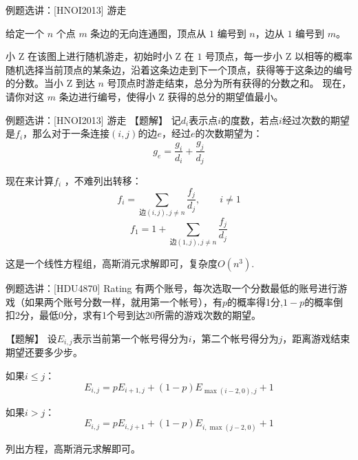 \documentclass{beamer}
\begin{document}
\begin{frame}{例题选讲：[HNOI2013] 游走}

给定一个 $n$ 个点 $m$ 条边的无向连通图，顶点从 $1$ 编号到 $n$，边从 $1$ 编号到 $m$。 

小 Z 在该图上进行随机游走，初始时小 Z 在 $1$ 号顶点，每一步小 Z 以相等的概率随机选择当前顶点的某条边，沿着这条边走到下一个顶点，获得等于这条边的编号的分数。当小 Z 到达 $n$ 号顶点时游走结束，总分为所有获得的分数之和。 现在，请你对这 $m$ 条边进行编号，使得小 Z 获得的总分的期望值最小。

\end{frame}

\begin{frame}{例题选讲：[HNOI2013] 游走}
    【题解】 记$d_i$表示点$i$的度数，若点$i$经过次数的期望是$f_i$，那么对于一条连接$(i,j)$的边$e$，经过$e$的次数期望为：
    \begin{equation*}
        g_e=\frac{g_i}{d_i}+\frac{g_j}{d_j}
    \end{equation*}

    现在来计算$f_i$
    \pause
    ，不难列出转移：
    \begin{equation*}
        f_i=\sum_{\text{边}(i,j),j\neq n} \frac{f_j}{d_j},\qquad i\neq 1
    \end{equation*}
    \begin{equation*}
        f_1=1+\sum_{\text{边}(1,j),j\neq n} \frac{f_j}{d_j}
    \end{equation*}

    这是一个线性方程组，高斯消元求解即可，复杂度$O(n^3)$.
\end{frame}

\begin{frame}{例题选讲：[HDU4870] Rating}
    \small 
    有两个账号，每次选取一个分数最低的账号进行游戏（如果两个账号分数一样，就用第一个帐号），有$p$的概率得1分,$1-p$的概率倒扣2分，最低0分，求有1个号到达20所需的游戏次数的期望。

    \vspace{1em}\pause
    【题解】 设$E_{i,j}$表示当前第一个帐号得分为$i$，第二个帐号得分为$j$，距离游戏结束期望还要多少步。

    \pause
    如果$i\leq j$：
    \begin{equation*}
        E_{i,j}=pE_{i+1,j}+(1-p)E_{\max(i-2,0),j}+1
    \end{equation*}

    如果$i>j$：
    \begin{equation*}
        E_{i,j}=pE_{i,j+1}+(1-p)E_{i,\max(j-2,0)}+1
    \end{equation*}

    \pause
    列出方程，高斯消元求解即可。
\end{frame}
\end{document}
